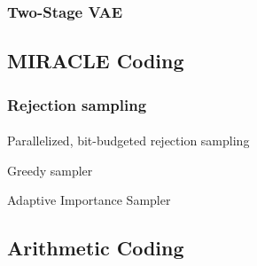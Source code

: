 \documentclass{article}
\begin{document}
\subsubsection{Two-Stage VAE}
\paragraph{}
\cite{dai2019diagnosing}

\subsection{MIRACLE Coding}
\label{sec:mir_coding}
\paragraph{}
\cite{havasi2018minimal}

\subsubsection{Rejection sampling}
\paragraph{}
\cite{harsha2007communication}


\begin{algorithm}
  \caption{Parallelized, bit-budgeted rejection sampling}
  \label{alg:multivariate_rej_samp}
  \begin{algorithmic}
    \State
    \EndProcedure
  \end{algorithmic}
\end{algorithm}

\begin{algorithm}
  \caption{Greedy sampler}
  \label{alg:greedy_sampler}
  \begin{algorithmic}
    \State
    \EndProcedure
  \end{algorithmic}
\end{algorithm}

\begin{algorithm}
  \caption{Adaptive Importance Sampler}
  \label{alg:adaptive_importance_sampler}
  \begin{algorithmic}
    \State
    \EndProcedure
  \end{algorithmic}
\end{algorithm}

\subsection{Arithmetic Coding}
\end{document}
